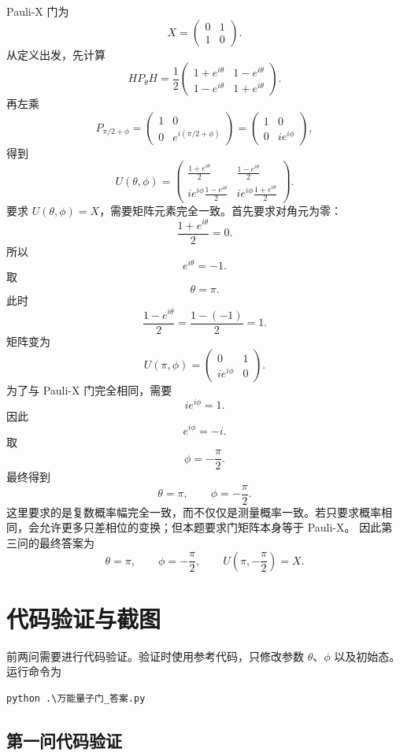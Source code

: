 \documentclass[UTF8]{ctexart}
\begin{document}
Pauli-X 门为
\[
X=
\begin{pmatrix}
0 & 1\\
1 & 0
\end{pmatrix}.
\]
从定义出发，先计算
\[
HP_\theta H
=\frac{1}{2}
\begin{pmatrix}
1+e^{i\theta} & 1-e^{i\theta}\\
1-e^{i\theta} & 1+e^{i\theta}
\end{pmatrix}.
\]
再左乘
\[
P_{\pi/2+\phi}
=
\begin{pmatrix}
1 & 0\\
0 & e^{i(\pi/2+\phi)}
\end{pmatrix}
=
\begin{pmatrix}
1 & 0\\
0 & i e^{i\phi}
\end{pmatrix},
\]
得到
\[
U(\theta,\phi)=
\begin{pmatrix}
\frac{1+e^{i\theta}}{2}
&
\frac{1-e^{i\theta}}{2}
\\
i e^{i\phi}\frac{1-e^{i\theta}}{2}
&
i e^{i\phi}\frac{1+e^{i\theta}}{2}
\end{pmatrix}.
\]
要求 $U(\theta,\phi)=X$，需要矩阵元素完全一致。首先要求对角元为零：
\[
\frac{1+e^{i\theta}}{2}=0.
\]
所以
\[
e^{i\theta}=-1.
\]
取
\[
\theta=\pi.
\]
此时
\[
\frac{1-e^{i\theta}}{2}
=\frac{1-(-1)}{2}
=1.
\]
矩阵变为
\[
U(\pi,\phi)=
\begin{pmatrix}
0 & 1\\
i e^{i\phi} & 0
\end{pmatrix}.
\]
为了与 Pauli-X 门完全相同，需要
\[
i e^{i\phi}=1.
\]
因此
\[
e^{i\phi}=-i.
\]
取
\[
\phi=-\frac{\pi}{2}.
\]
最终得到
\[
\theta=\pi,
\qquad
\phi=-\frac{\pi}{2}.
\]
这里要求的是复数概率幅完全一致，而不仅仅是测量概率一致。若只要求概率相同，会允许更多只差相位的变换；但本题要求门矩阵本身等于 Pauli-X。
因此第三问的最终答案为
\[
\boxed{\theta=\pi,\qquad \phi=-\frac{\pi}{2},\qquad U\left(\pi,-\frac{\pi}{2}\right)=X.}
\]

\section{代码验证与截图}

前两问需要进行代码验证。验证时使用参考代码，只修改参数 $\theta$、$\phi$ 以及初始态。运行命令为
\begin{lstlisting}
python .\万能量子门_答案.py
\end{lstlisting}

\subsection{第一问代码验证}
\end{document}
